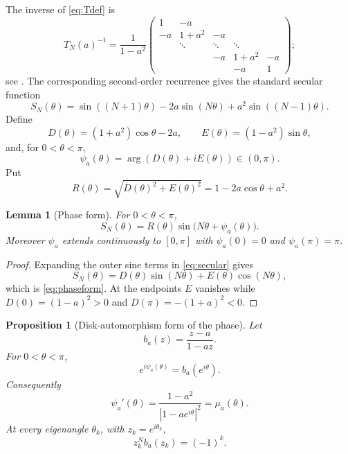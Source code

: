 \documentclass[11pt,reqno]{amsart}
\theoremstyle{plain}
\newtheorem{proposition}[theorem]{Proposition}
\newtheorem{lemma}[theorem]{Lemma}
\theoremstyle{definition}
\begin{document}
The inverse of \eqref{eq:Tdef} is
\begin{equation}\label{eq:Tinv}
T_N(a)^{-1}=\frac1{1-a^2}
\begin{pmatrix}
1 & -a \\
-a & 1+a^2 & -a\\
& \ddots & \ddots & \ddots\\
&&-a&1+a^2&-a\\
&&&-a&1
\end{pmatrix};
\end{equation}
see \cite{KMS}.  The corresponding second-order recurrence gives the standard
secular function
\begin{equation}\label{eq:secular}
S_N(\theta)
=\sin((N+1)\theta)-2a\sin(N\theta)+a^2\sin((N-1)\theta).
\end{equation}
Define
\begin{equation}\label{eq:DE}
D(\theta)=(1+a^2)\cos\theta-2a,
\qquad
E(\theta)=(1-a^2)\sin\theta,
\end{equation}
and, for $0<\theta<\pi$,
\begin{equation}\label{eq:psi}
\psi_a(\theta)=\arg(D(\theta)+iE(\theta))\in(0,\pi).
\end{equation}
Put
\[
R(\theta)=\sqrt{D(\theta)^2+E(\theta)^2}
=1-2a\cos\theta+a^2.
\]

\begin{lemma}[Phase form]\label{lem:phase}
For $0<\theta<\pi$,
\begin{equation}\label{eq:phaseform}
S_N(\theta)=R(\theta)\sin\bigl(N\theta+\psi_a(\theta)\bigr).
\end{equation}
Moreover $\psi_a$ extends continuously to $[0,\pi]$ with
$\psi_a(0)=0$ and $\psi_a(\pi)=\pi$.
\end{lemma}

\begin{proof}
Expanding the outer sine terms in \eqref{eq:secular} gives
\[
S_N(\theta)=D(\theta)\sin(N\theta)+E(\theta)\cos(N\theta),
\]
which is \eqref{eq:phaseform}.  At the endpoints $E$ vanishes while
$D(0)=(1-a)^2>0$ and $D(\pi)=-(1+a)^2<0$.
\end{proof}

\begin{proposition}[Disk-automorphism form of the phase]\label{prop:blaschke}
Let
\begin{equation}\label{eq:blaschke}
b_a(z)=\frac{z-a}{1-az}.
\end{equation}
For $0<\theta<\pi$,
\begin{equation}\label{eq:blaschkephase}
\boxed{
e^{i\psi_a(\theta)}=b_a(e^{i\theta}).}
\end{equation}
Consequently
\begin{equation}\label{eq:psiprime}
\boxed{
\psi_a'(\theta)=
\frac{1-a^2}{|1-ae^{i\theta}|^2}
=\mu_a(\theta).}
\end{equation}
At every eigenangle $\theta_k$, with $z_k=e^{i\theta_k}$,
\begin{equation}\label{eq:blaschkequant}
\boxed{z_k^N b_a(z_k)=(-1)^k.}
\end{equation}
\end{proposition}
\end{document}

